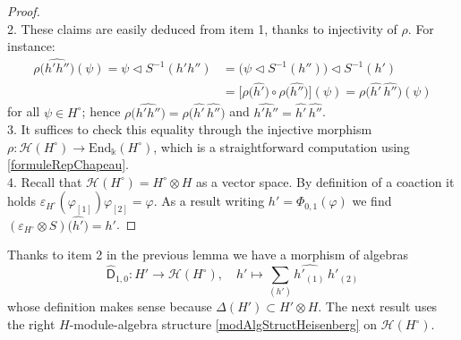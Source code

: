 \documentclass[11pt]{amsart}
\begin{document}
\begin{proof}
\\2. These claims are easily deduced from item 1, thanks to injectivity of $\rho$. For instance:
\begin{align*}
\rho\bigl( \widehat{h'h''} \bigr)(\psi) = \psi \lhd S^{-1}(h'h'') &= \bigl( \psi \lhd S^{-1}(h'') \bigr) \lhd S^{-1}(h')\\
&= \bigl[ \rho\bigl(\widehat{h'}\bigr) \circ \rho\bigl( \widehat{h''} \bigr) \bigr](\psi) = \rho\bigl( \widehat{h'}\,\widehat{h''} \bigr)(\psi)
\end{align*}
for all $\psi \in H^\circ$; hence $\rho\bigl( \widehat{h'h''} \bigr) = \rho\bigl( \widehat{h'}\,\widehat{h''} \bigr)$ and $\widehat{h'h''} = \widehat{h'}\,\widehat{h''}$.
\\3. It suffices to check this equality through the injective morphism $\rho : \mathcal{H}(H^\circ) \to \mathrm{End}_\Bbbk(H^\circ)$, which is a straightforward computation using \eqref{formuleRepChapeau}.
\\4. Recall that $\mathcal{H}(H^\circ) = H^\circ \otimes H$ as a vector space. By definition of a coaction it holds $\varepsilon_{H^\circ}(\varphi_{[1]})\varphi_{[2]} = \varphi$. As a result writing $h' = \Phi_{0,1}(\varphi)$ we find $(\varepsilon_{H^\circ} \otimes S)\bigl(\widehat{h'} \bigr) = h'$.
\end{proof}

Thanks to item 2 in the previous lemma we have a morphism of algebras
\[ \widehat{\mathsf{D}}_{1,0} : H' \to \mathcal{H}(H^\circ), \quad h' \mapsto \textstyle \sum_{(h')} \widehat{h'_{(1)}} \, h'_{(2)} \]
whose definition makes sense because $\Delta(H') \subset H' \otimes H$. The next result uses the right $H$-module-algebra structure \eqref{modAlgStructHeisenberg} on $\mathcal{H}(H^\circ)$.
\end{document}
